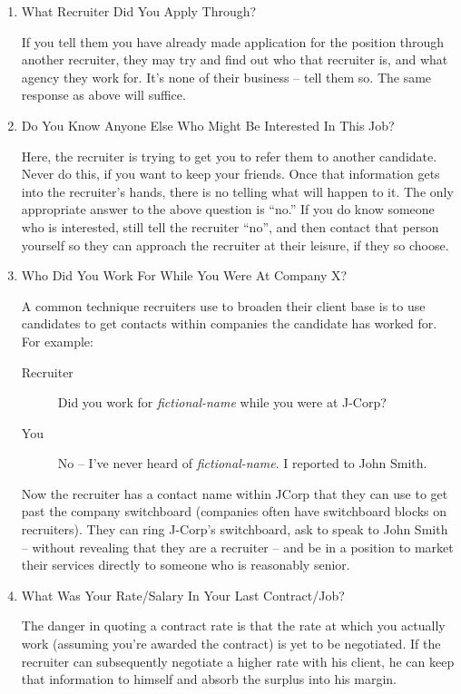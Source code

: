 \documentclass{article}
\begin{document}
\begin{enumerate}
\begin{enumerate}
\begin{enumerate}
\item What Recruiter Did You Apply Through?
\label{sec:orgheadline105}

If you tell them you have already made application for the position
through another recruiter, they may try and find out who that recruiter
is, and what agency they work for. It's none of their business -- tell
them so. The same response as above will suffice.

\item Do You Know Anyone Else Who Might Be Interested In This Job?
\label{sec:orgheadline106}

Here, the recruiter is trying to get you to refer them to another
candidate. Never do this, if you want to keep your friends. Once that
information gets into the recruiter's hands, there is no telling what
will happen to it. The only appropriate answer to the above question is
“no.” If you do know someone who is interested, still tell the recruiter
“no”, and then contact that person yourself so they can approach the
recruiter at their leisure, if they so choose.

\item Who Did You Work For While You Were At Company X?
\label{sec:orgheadline107}

A common technique recruiters use to broaden their client base is to use
candidates to get contacts within companies the candidate has worked
for. For example:

\begin{description}
\item[{Recruiter}] Did you work for \emph{fictional-name} while you were at
J-Corp?
\item[{You}] No -- I've never heard of \emph{fictional-name}. I reported to John
Smith.
\end{description}

Now the recruiter has a contact name within JCorp that they can use to
get past the company switchboard (companies often have switchboard
blocks on recruiters). They can ring J-Corp's switchboard, ask to speak
to John Smith -- without revealing that they are a recruiter -- and be
in a position to market their services directly to someone who is
reasonably senior.

\item What Was Your Rate/Salary In Your Last Contract/Job?
\label{sec:orgheadline108}

The danger in quoting a contract rate is that the rate at which you
actually work (assuming you're awarded the contract) is yet to be
negotiated. If the recruiter can subsequently negotiate a higher rate
with his client, he can keep that information to himself and absorb the
surplus into his margin.
\end{enumerate}


\end{enumerate}
\end{enumerate}
\end{document}
